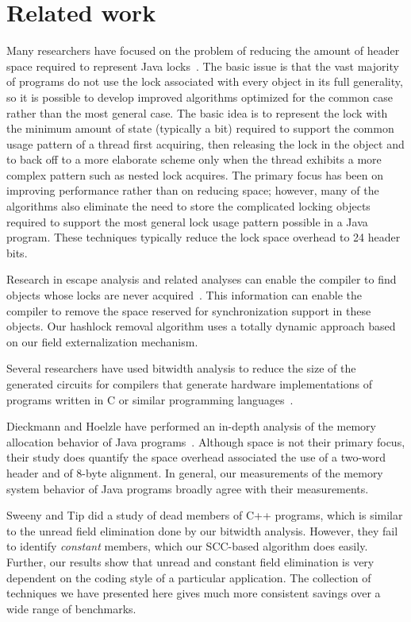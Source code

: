 \documentclass[preprint]{acmconf}
\begin{document}
\section{Related work}

Many researchers have focused on the problem of reducing the amount of
header space required to represent Java
locks~\cite{BKMS98,OK99,ADGKRW99}. The basic issue is that the vast
majority of programs do not use the lock associated with every object
in its full generality, so it is possible to develop improved
algorithms optimized for the common case rather than the most general
case. The basic idea is to represent the lock with the minimum amount
of state (typically a bit) required to support the common usage
pattern of a thread first acquiring, then releasing the lock in the
object and to back off to a more elaborate scheme only when the thread
exhibits a more complex pattern such as nested lock acquires. The
primary focus has been on improving performance rather than on
reducing space; however, many of the algorithms also eliminate the
need to store the complicated locking objects required to support the
most general lock usage pattern possible in a Java program. These
techniques typically reduce the lock space overhead to 24 header bits.

Research in escape analysis and related analyses can enable the
compiler to find objects whose locks are never 
acquired~\cite{ACSE99,BH99,WR99:OOPSLA99,CGSSM99,Ruf00:PLDI00,SR01:PPOPP01}.
This information can enable the compiler to remove the space
reserved for synchronization support in these objects. 
Our hashlock removal algorithm uses a totally dynamic approach
based on our field externalization mechanism. 

Several researchers have used bitwidth analysis to reduce the size
of the generated circuits for compilers that generate hardware
implementations of programs written in C or similar programming 
languages~\cite{ananian:siliconc,RR00:PLDI00,SBA00:PLDI00,BGSW00}.

Dieckmann and Hoelzle have performed an in-depth analysis of the
memory allocation behavior of Java programs~\cite{DH99}. Although 
space is not their primary focus, their study does quantify 
the space overhead associated the use of a two-word header
and of 8-byte alignment. In general, our measurements of the 
memory system behavior of Java programs broadly agree with their
measurements. 

Sweeny and Tip \cite{SweeneyTip98DeadDataMembers} did a study of dead
members of C++ programs, which is similar to the unread field
elimination done by our bitwidth analysis.  However, they
fail to identify {\it constant} members, which our SCC-based algorithm
does easily.  Further, our results show that unread and constant field
elimination is very dependent on the coding style of a particular
application.  The collection of techniques we have presented here
gives much more consistent savings over a wide range of benchmarks.
\end{document}
